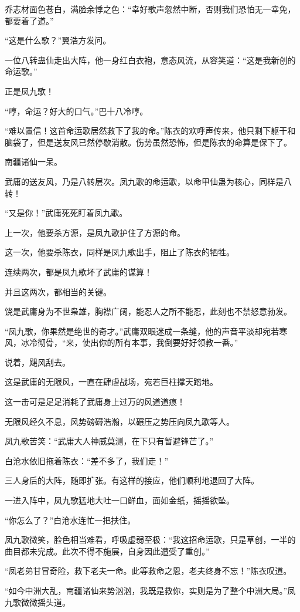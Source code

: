 \begin{this_body}
乔志材面色苍白，满脸余悸之色：“幸好歌声忽然中断，否则我们恐怕无一幸免，都要着了道。”

“这是什么歌？”翼浩方发问。

一位八转蛊仙走出大阵，他一身红白衣袍，意态风流，从容笑道：“这是我新创的命运歌。”

正是凤九歌！

“哼，命运？好大的口气。”巴十八冷哼。

“难以置信！这首命运歌居然救下了我的命。”陈衣的欢呼声传来，他只剩下躯干和脑袋了，但是送友风已然停歇消散。伤势虽然恐怖，但是陈衣的命算是保下了。

南疆诸仙一呆。

武庸的送友风，乃是八转层次。凤九歌的命运歌，以命甲仙蛊为核心，同样是八转！

“又是你！”武庸死死盯着凤九歌。

上一次，他要杀方源，是凤九歌护住了方源的命。

这一次，他要杀陈衣，同样是凤九歌出手，阻止了陈衣的牺牲。

连续两次，都是凤九歌坏了武庸的谋算！

并且这两次，都相当的关键。

饶是武庸身为不世枭雄，胸襟广阔，能忍人之所不能忍，此刻也不禁怒意勃发。

“凤九歌，你果然是绝世的奇才。”武庸双眼迷成一条缝，他的声音平淡却宛若寒风，冰冷彻骨，“来，使出你的所有本事，我倒要好好领教一番。”

说着，飓风刮去。

这是武庸的无限风，一直在肆虐战场，宛若巨柱撑天踏地。

这一击可是足足消耗了武庸身上过万的风道道痕！

无限风经久不息，风势磅礴浩瀚，以碾压之势压向凤九歌等人。

凤九歌苦笑：“武庸大人神威莫测，在下只有暂避锋芒了。”

白沧水依旧拖着陈衣：“差不多了，我们走！”

三人身后的大阵，随即扩张。有这样的接应，他们顺利地退回了大阵。

一进入阵中，凤九歌猛地大吐一口鲜血，面如金纸，摇摇欲坠。

“你怎么了？”白沧水连忙一把扶住。

凤九歌微笑，脸色相当难看，呼吸虚弱至极：“我这招命运歌，只是草创，一半的曲目都未完成。此次不得不施展，自身因此遭受了重创。”

“凤老弟甘冒奇险，救下老夫一命。此等救命之恩，老夫终身不忘！”陈衣叹道。

“如今中洲大乱，南疆诸仙来势汹汹，我既是救你，实则是为了整个中洲大局。”凤九歌微微摇头道。


\end{this_body}
